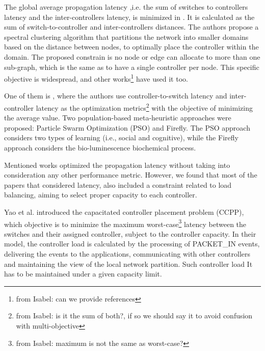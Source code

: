 \documentclass{IEEEtran}
\newcommand\fia[1]{{\color{red}\footnote{\color{red}from Isabel: #1}}} %
\newcommand\mia[1]{{\color{red}#1}}%
\newcommand\delia[1]{{\tiny{\color{red}#1}}} %
\begin{document}
The global average propagation latency ,i.e. the sum of switches to controllers latency and the inter-controllers latency, is minimized in \cite{SaSa16}. It is calculated as the sum of switch-to-controller and inter-controllers distances. The authors propose a spectral clustering algorithm that partitions the network into smaller domains based on the distance between nodes, to optimally place the controller within the domain. The proposed constrain is no node or edge can allocate to more than one sub-graph, which is the same as to have a single controller per node. This specific objective is widespread, and other works\fia{can we provide references} have used it too. 

One of them is \cite{SaSa17}, where the authors use controller-to-switch latency and inter-controller latency as the optimization metrics\fia{is it the sum of both?, if so we should say it to avoid confusion with multi-objective} with the objective of minimizing the average value. Two population-based meta-heuristic approaches were proposed: Particle Swarm Optimization (PSO) and Firefly. The PSO approach considers two types of learning (i.e., social and cognitive), while the Firefly approach considers the bio-luminescence biochemical process. %

Mentioned works optimized the propagation latency without taking into consideration any other performance metric. However, we found that most of the papers that considered latency, also included a constraint related to load balancing, aiming to select proper capacity to each controller.

Yao et al. \cite{YaBi14}  introduced the capacitated controller placement problem (CCPP), which objective is to minimize the maximum worst-case\fia{maximum is not the same as worst-case?} latency between the switches and their assigned controller, subject to the controller capacity. In their model, the controller load is calculated by the processing of PACKET\_IN events, delivering the events to the applications, communicating with other controllers and maintaining the view of the local network partition. \mia{Such controller load} \delia{It} has to be maintained under a \mia{given} capacity limit. %
\end{document}
